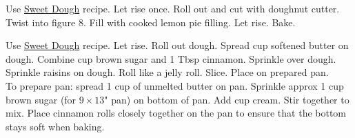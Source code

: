 \begin{minipage}{\linewidth}
\end{minipage}\par\begin{minipage}{\linewidth} 

\end{minipage}\par\begin{minipage}{\linewidth} 
Use \hyperlink{sweetdoughlink}{Sweet Dough} recipe. Let rise once. Roll out and cut with doughnut cutter. Twist into figure 8. Fill with cooked lemon pie filling. Let rise. Bake.

\end{minipage}\par\begin{minipage}{\linewidth} 
Use \hyperlink{sweetdoughlink}{Sweet Dough} recipe. Let rise. Roll out dough. Spread  cup softened butter on dough. Combine  cup brown sugar and 1 Tbsp cinnamon. Sprinkle over dough. Sprinkle raisins on dough. Roll like a jelly roll. Slice. Place on prepared pan.\\
To prepare pan: spread 1 cup of unmelted butter on pan. Sprinkle approx 1 cup brown sugar (for $9 \times 13$" pan) on bottom of pan. Add  cup cream. Stir together to mix.
Place cinnamon rolls closely together on the pan to ensure that the bottom stays soft when baking.


\end{minipage}
